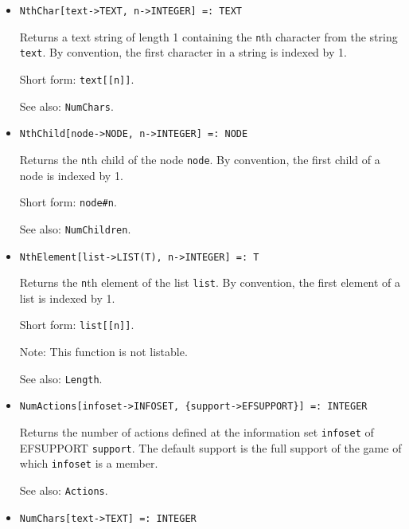\begin{itemize}
\item
\protect \large \begin{verbatim}
NthChar[text->TEXT, n->INTEGER] =: TEXT
\end{verbatim}\normalsize

\bd
Returns a text string of length 1 containing the \verb+n+th
character from the string \verb+text+.  By convention, the first character
in a string is indexed by 1.
\item
[Short form:] \verb+text[[n]]+.
\item
[See also:] {\tt NumChars}.
\ed

\item
\protect \large \begin{verbatim} 
NthChild[node->NODE, n->INTEGER] =: NODE
\end{verbatim}\normalsize

\bd
Returns the \verb+n+th child of the node \verb+node+.
By convention, the first child of a node is indexed by 1.
\item
[Short form:] \verb+node#n+.
\item
[See also:] {\tt NumChildren}.
\ed

\item
\protect \large \begin{verbatim}
NthElement[list->LIST(T), n->INTEGER] =: T 
\end{verbatim}\normalsize

\bd
Returns the \verb+n+th element of the list \verb+list+.
By convention, the first element of a list is indexed by 1.
\item
[Short form:] \verb+list[[n]]+.
\item
[Note:] This function is not listable.
\item
[See also:] {\tt Length}.
\ed

\item
\protect \large \begin{verbatim}
NumActions[infoset->INFOSET, {support->EFSUPPORT}] =: INTEGER
\end{verbatim}\normalsize

\bd
Returns the number of actions defined at the information
set \verb+infoset+ of EFSUPPORT \verb+support+.  The default support
is the full support of the game of which \verb+infoset+ is a member.  
\item
[See also:] {\tt Actions}.
\ed

\item
\protect \large \begin{verbatim}
NumChars[text->TEXT] =: INTEGER
\end{verbatim}\normalsize


\end{itemize}
